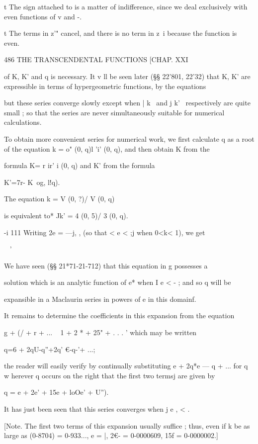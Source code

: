 t The sign attached to   is a matter of indifference, since we deal exclusively with even 
functions of v and -. 

t The terms in z'"  cancel, and there is no term in z~i because the function is even. 



486 THE TRANSCENDENTAL FUNCTIONS [CHAP. XXI 

of K, K' and q is necessary. It  v ll be seen later (§§ 22'801, 22'32) that 
K, K' are expressible in terms of hypergeometric functions, by the equations 

but these series converge slowly except when | k \ and j k' \ respectively are 
quite small ; so that the series are never simultaneously suitable for numerical 
calculations. 

To obtain more convenient series for numerical work, we first calculate q 
as a root of the equation k =  o" (0, q)l 'i' (0, q), and then obtain K from the 

formula K= r ir' i (0, q) and K' from the formula 

K'=7r- K\ og, l!q). 

The equation k = V (0, ?)/ V (0, q) 

is equivalent to*  Jk' =  4 (0, 5)/ 3 (0, q). 

-i 111 
Writing 2e = —j, , (so that < e < ;j when 0<k< 1), we get 

\ %
 ' %

We have seen (§§ 21*71-21-712) that this equation in g  possesses a 

solution which is an analytic function of e* when I e < - ; and so q will be 

expansible in a Maclaurin series in powers of e in this domainf. 

It remains to determine the coefficients in this expansion from the 
equation 

g + (/ + r + ... 
  ~ 1 + 2 * + 25" + . . . ' 
which may be written 

q=6 + 2qU-q''+2q' €-q-'+ ...; 

the reader will easily verify by continually substituting e + 2q*e — q  + ... 
for q w herever q occurs on the right that the first two termsj are given by 

q = e + 2e' + 15e  + loOe'  + U''). 

It has just been seen that this series converges when j e , <   . 

[Note. The first two terms of this expansion usually suffice ; thus, even if k be as 
large as  (0-8704) = 0-933..., e = |, 2€-  = 0-0000609, 15f  = 0-0000002.] 


